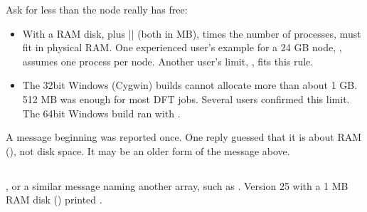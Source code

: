 \documentclass[letterpaper,10pt,english,openany,oneside]{sphinxmanual}
\begin{document}
\sphinxAtStartPar
{} Ask for less than the node really has free:
\begin{itemize}
\item {} 
\sphinxAtStartPar
With a RAM disk,  plus || (both in MB), times the number of processes, must fit in physical RAM.
One experienced user’s example for a 24 GB node, , assumes one process per node. Another
user’s limit, , fits this rule.



\item {} 
\sphinxAtStartPar
The 32\sphinxhyphen{}bit Windows (Cygwin) builds cannot allocate more than about 1 GB. 512 MB was enough for most DFT jobs.
Several users confirmed this limit. The 64\sphinxhyphen{}bit Windows build  ran with .



\end{itemize}

\sphinxAtStartPar
A message beginning  was reported once. One reply guessed that it is about RAM
(), not disk space. It may be an older form of the  message above.




\subsection{}
\label{\detokenize{troubleshooting/common-problems:out-of-disk-space}}
\sphinxAtStartPar
{} , or a similar message naming another array, such as
. Version 25 with a 1 MB RAM disk () printed .
\end{document}
